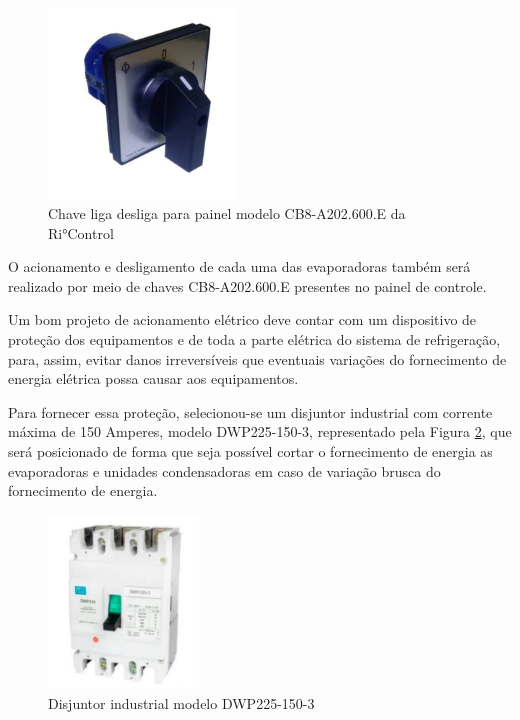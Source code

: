 \documentclass[10pt,a4paper]{article}
\begin{document}
\begin{figure}[H]
    \centering
    \includegraphics[width=5cm]{Figuras/fig_chave_comp_geral.PNG}
    \caption{Chave liga desliga para painel modelo CB8-A202.600.E da Ri°Control}
    \label{fig_chave_comp_geral}
\end{figure}

O acionamento e desligamento de cada uma das evaporadoras também será realizado por meio de chaves CB8-A202.600.E presentes no painel de controle.

Um bom projeto de acionamento elétrico deve contar com um dispositivo de proteção dos equipamentos e de toda a parte elétrica do sistema de refrigeração, para, assim, evitar danos irreversíveis que eventuais variações do fornecimento de energia elétrica possa causar aos equipamentos.

Para fornecer essa proteção, selecionou-se um disjuntor industrial com corrente máxima de 150 Amperes, modelo DWP225-150-3, representado pela Figura \ref{fig_disjuntor}, que será posicionado de forma que seja possível cortar o fornecimento de energia as evaporadoras e unidades condensadoras em caso de variação brusca do fornecimento de energia.

\begin{figure}[H]
    \centering
    \includegraphics[width=4cm]{Figuras/fig_disjuntor.PNG}
    \caption{Disjuntor industrial modelo DWP225-150-3}
    \label{fig_disjuntor}
\end{figure}
\end{document}
